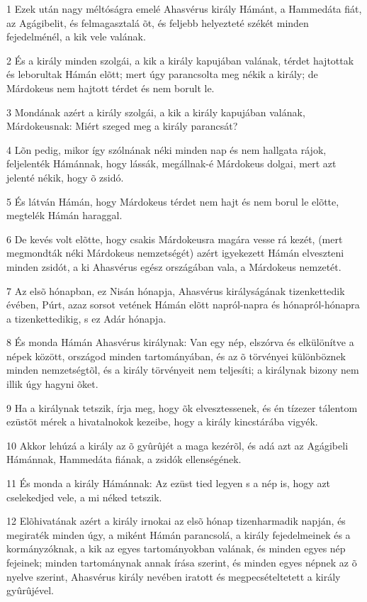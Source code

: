 \par 1 Ezek után nagy méltóságra emelé Ahasvérus király Hámánt, a Hammedáta fiát, az Agágibelit, és felmagasztalá õt, és feljebb helyezteté székét minden fejedelménél, a kik vele valának.
\par 2 És a király minden szolgái, a kik a király kapujában valának, térdet hajtottak és leborultak Hámán elõtt; mert úgy parancsolta meg nékik a király; de Márdokeus nem hajtott térdet és nem borult le.
\par 3 Mondának azért a király szolgái, a kik a király kapujában valának, Márdokeusnak: Miért szeged meg a király parancsát?
\par 4 Lõn pedig, mikor így szólnának néki minden nap és nem hallgata rájok, feljelenték Hámánnak, hogy lássák, megállnak-é Márdokeus dolgai, mert azt jelenté nékik, hogy õ zsidó.
\par 5 És látván Hámán, hogy Márdokeus térdet nem hajt és nem borul le elõtte, megtelék Hámán haraggal.
\par 6 De kevés volt elõtte, hogy csakis Márdokeusra magára vesse rá kezét, (mert megmondták néki Márdokeus nemzetségét) azért igyekezett Hámán elveszteni minden zsidót, a ki Ahasvérus egész országában vala, a Márdokeus nemzetét.
\par 7 Az elsõ hónapban, ez Nisán hónapja, Ahasvérus királyságának tizenkettedik évében, Púrt, azaz sorsot vetének Hámán elõtt napról-napra és hónapról-hónapra a tizenkettedikig, s ez Adár hónapja.
\par 8 És monda Hámán Ahasvérus királynak: Van egy nép, elszórva és elkülönítve a népek között, országod minden tartományában, és az õ törvényei különböznek minden nemzetségtõl, és a király törvényeit nem teljesíti; a királynak bizony nem illik úgy hagyni õket.
\par 9 Ha a királynak tetszik, írja meg, hogy õk elvesztessenek, és én tízezer tálentom ezüstöt mérek a hivatalnokok kezeibe, hogy a király kincstárába vigyék.
\par 10 Akkor lehúzá a király az õ gyûrûjét a maga kezérõl, és adá azt az Agágibeli Hámánnak, Hammedáta fiának, a zsidók ellenségének.
\par 11 És monda a király Hámánnak: Az ezüst tied legyen s a nép is, hogy azt cselekedjed vele, a mi néked tetszik.
\par 12 Elõhivatának azért a király irnokai az elsõ hónap tizenharmadik napján, és megiraték minden úgy, a miként Hámán parancsolá, a király fejedelmeinek és a kormányzóknak, a kik az egyes tartományokban valának, és minden egyes nép fejeinek; minden tartománynak annak írása szerint, és minden egyes népnek az õ nyelve szerint, Ahasvérus király nevében iratott és megpecsételtetett a király gyûrûjével.
